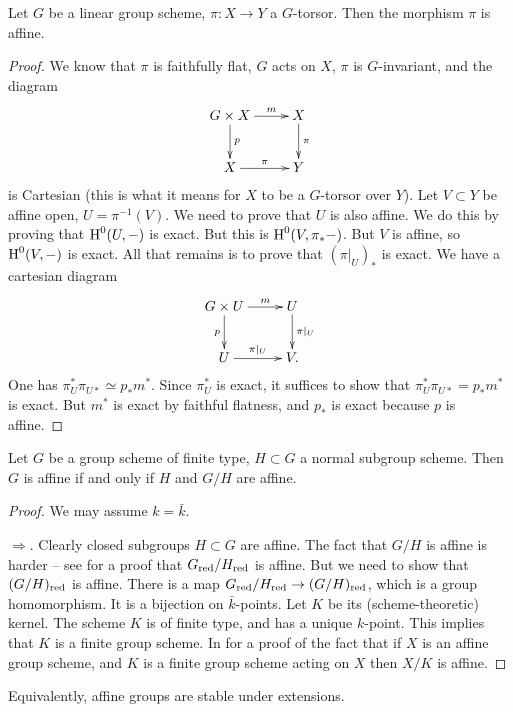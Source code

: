 \begin{lemm}
Let $G$ be a linear group scheme, $\pi:X\to Y$ a $G$-torsor. Then the morphism 
$\pi$ is affine. 
\end{lemm}
\begin{proof}
We know that $\pi$ is faithfully flat, $G$ acts on $X$, $\pi$ is $G$-invariant, 
and the diagram 
\[\xymatrix{
  G\times X \ar[r]^-m \ar[d]^-p 
    & X \ar[d]^-\pi \\
  X \ar[r]^-\pi 
    & Y
}\]
is Cartesian (this is what it means for $X$ to be a $G$-torsor over $Y$). 
Let $V\subset Y$ be affine open, $U=\pi^{-1}(V)$. We need to prove that 
$U$ is also affine. We do this by proving that $\operatorname{H}^0(U,-)$ is exact. But 
this is $\operatorname{H}^0(V,\pi_\ast -)$. But $V$ is affine, so $\operatorname{H}^0(V,-)$ is 
exact. All that remains is to prove that $(\pi|_U)_\ast$ is exact. We have a 
cartesian diagram 
\[\xymatrix{
  G\times U \ar[r]^-m \ar[d]_p 
    & U \ar[d]^-{\pi|_U} \\ 
  U \ar[r]^-{\pi|_U} 
    & V .
}\]
One has $\pi_U^\ast \pi_{U\ast} \simeq p_\ast m^\ast$. Since 
$\pi_U^\ast$ is exact, it suffices to show that 
$\pi_U^\ast \pi_{U\ast} = p_\ast m^\ast$ is exact. But $m^\ast$ is exact by 
faithful flatness, and $p_\ast$ is exact because $p$ is affine. 
\end{proof}

\begin{prop}
Let $G$ be a group scheme of finite type, $H\subset G$ a normal subgroup 
scheme. Then $G$ is affine if and only if $H$ and $G/H$ are affine. 
\end{prop}
\begin{proof}
We may assume $k=\bar k$. 

$\Rightarrow$. Clearly closed subgroups $H\subset G$ are affine. The fact that 
$G/H$ is affine is harder -- see \cite{b91} for a proof that 
$G_{\mathrm{red}}/H_{\mathrm{red}}$ is affine. But we need to show that 
$(G/H)_{\mathrm{red}}$ is affine. There is a map 
$G_{\mathrm{red}}/H_{\mathrm{red}} \to (G/H)_{\mathrm{red}}$, which is a group homomorphism. 
It is a bijection on $\bar k$-points. Let $K$ be its (scheme-theoretic) 
kernel. The scheme $K$ is of finite type, and has a unique $k$-point. This 
implies that $K$ is a finite group scheme. In \cite{m08} for a proof of the 
fact that if $X$ is an affine group scheme, and $K$ is a finite group scheme acting 
on $X$ then $X/K$ is affine. 
\end{proof}

Equivalently, affine groups are stable under extensions. 


